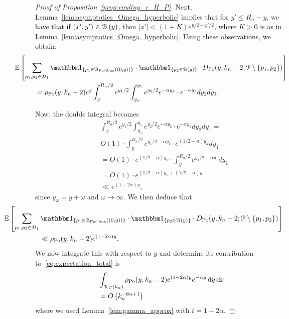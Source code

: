 \begin{proof}[Proof of Proposition~\ref{prop:couling_c_H_P}]
Next, Lemma~\ref{lem:asymptotics_Omega_hyperbolic} implies that for $y'\leq R_n -y$, we have that if $(x',y') \in {\mathcal B}\left(y\right)$, then $|x'| < (1+ K) e^{y/2 + y'/2}$, where $K >0$ is as in Lemma~\ref{lem:asymptotics_Omega_hyperbolic}. Using these observations, we obtain: 
\begin{align*}
	&\hspace{-30pt} \Exp{\sum_{p_1, p_2\in \dom{1}} \ind{p_1 \in \BallInter{(0,y)}} \cdot \ind{p_2 \in \BallHyp{y}} \cdot 
	D_{\Po} (y,k_n-2;\Pcal \setminus \{p_1, p_2\})} \\
	&= \rho_{\Po}(y,k_n-2)
	e^{y}\int_y^{R_n/2} e^{y_1/2}\int_{y_\omega}^{y_1} e^{y_2/2} e^{-\alpha y_2} \cdot e^{-\alpha y_1} dy_2 dy_1.
\end{align*}

Now, the double integral becomes
\begin{equation}
\begin{split}
& \int_y^{R_n/2} e^{y_1/2}\int_{y_\omega}^{y_1} e^{y_2/2} e^{-\alpha y_2} \cdot e^{-\alpha y_1} dy_2 dy_1 = \\
&  O(1) \cdot  \int_y^{R_n/2} e^{y_1/2 - \alpha y_1} \cdot 
e^{(1/2 - \alpha) y_\omega} dy_1 \\
& =O(1) \cdot e^{(1/2 - \alpha) y_\omega} \cdot \int_y^{R_n/2} e^{y_1/2 - \alpha y_1} d y_1 \\
& =O(1) \cdot e^{(1/2 - \alpha) y_\omega + (1/2 - \alpha) y} \\ 
& \ll e^{(1 - 2\alpha) y},
\end{split}
\end{equation}
since $y_\omega = y + \omega$ and $\omega \to \infty$. 
We then deduce that 
\begin{equation}
\begin{split}
&\hspace{-50pt}\Exp{\sum_{p_1, p_2\in \dom{1}} \ind{p_1 \in \BallInter{(0,y)}} \cdot \ind{p_2 \in \BallHyp{y}} \cdot 
D_{\Po} (y,k_n-2;\Pcal \setminus \{p_1, p_2\})}\\
& \ll \rho_{\Po}(y,k_n-2) e^{(1-2\alpha)y}.
\end{split}
\end{equation}
We now integrate this with respect to $y$ and determine its contribution to~\eqref{eq:expectation_total} is 
\begin{align*} 
	& \int_{{\mathcal K}_{C}(k_n)} \rho_{{\mathrm{Po}}}(y,k_n-2) e^{(1-2\alpha)y} e^{-\alpha y} \operatorname{\mathrm{d}\hspace{-2pt}} y \operatorname{\mathrm{d}\hspace{-2pt}} x \\
	&= O\left(k_n^{-6\alpha + 1}\right)
\end{align*}
where we used Lemma~\ref{lem:gamma_approx} with $t = 1 - 2\alpha$.


\end{proof}
